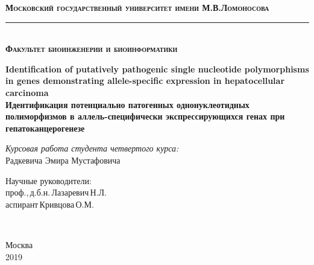 \begin{titlepage}

\newcommand{\HRule}{\rule{\linewidth}{0.3mm}} %

\center

\textbf{\textsc{Московский государственный университет имени М.В.Ломоносова}}
\\[0.3cm] 
\HRule 
\\[0.3cm]
\textbf{\textsc{Факультет биоинженерии и биоинформатики}}
\\[2.0cm]

\begin{spacing}{1.4}
{\LARGE \textbf{Identification of putatively pathogenic single nucleotide polymorphisms in genes demonstrating allele-specific expression in hepatocellular carcinoma}} \\[1.0cm]


{\LARGE \textbf{Идентификация потенциально патогенных однонуклеотидных полиморфизмов в аллель-специфически экспрессирующихся генах при гепатоканцерогенезе}} \\[2.0cm]
\end{spacing}
 
 
\Large \textit{Курсовая работа студента четвертого курса:}\\
Радкевича Эмира Мустафовича
\\[1.0cm]


\begin{flushright} \large
Научные руководители: \\
проф.,\,д.б.н.\,Лазаревич\,Н.Л. \\
аспирант\,Кривцова\,О.М. \\
[0.6cm]
\end{flushright}

\raggedright
\begin{minipage}[t]{0.45\textwidth}
	\vspace{0pt}
	\begin{flushleft} \large
		 \\
	\end{flushleft}
\end{minipage}
\vspace{\fill}

\center
{\large Москва \\ 2019}


\end{titlepage}